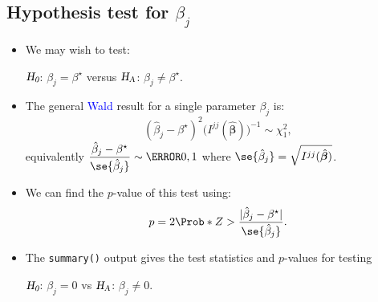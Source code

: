 \documentclass{article}\usepackage[]{graphicx}\usepackage[svgnames]{xcolor}
\newcommand{\HN}{\textsl{H}_{\textsl{0}}}%
\newcommand{\HA}{\textsl{H}_{\textsl{A}}}%
\DeclarePairedDelimiter\abs{\lvert}{\rvert}
\providecommand{\Vector}[1]{\bm{#1}}%
\begin{document}
\subsection*{Hypothesis test for $ \beta_j $}
\begin{itemize}
      \item We may wish to test:
            \begin{center}
                  $ \HN $: $ \beta_j=\beta^\star $ versus $ \HA $: $ \beta_j\ne \beta^\star $.
            \end{center}
      \item The general \textcolor{Blue}{Wald} result for a single parameter $ \beta_j $ is:
            \[ (\hat{\beta}_j-\beta^\star)^2\bigl(I^{jj}(\hat{\Vector{\beta}})\bigr)^{-1} \sim \chi^2_1, \]
            equivalently
            $ \displaystyle \frac{\hat{\beta}_j-\beta^\star}{\se{\hat{\beta}_j}}\sim \N{0,1} $
            where $ \se{\hat{\beta}_j}=\sqrt{I^{jj}(\hat{\Vector{\beta}})} $.
      \item We can find the $ p $-value of this test using:
            \[ p=2\Prob*{Z>\frac{\abs{\hat{\beta}_j-\beta^\star}}{\se{\hat{\beta}_j}}}. \]
      \item The \texttt{summary()} output gives the test statistics and $p$-values for testing
            \begin{center}
                  $ \HN $: $ \beta_j=0 $ vs $ \HA $: $ \beta_j\ne 0 $.
            \end{center}
\end{itemize}
\end{document}
